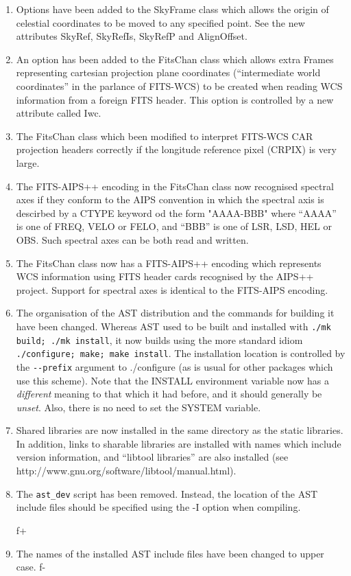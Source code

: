 \documentclass[twoside,11pt]{article}
\newcommand{\htmladdnormallink}[2]{#1}
\begin{document}
\begin{enumerate}

\item Options have been added to the SkyFrame class which allows the
origin 
of celestial coordinates to be moved to any specified point. See the new
attributes SkyRef, SkyRefIs, SkyRefP and AlignOffset.

\item An option has been added to the FitsChan class which allows extra
Frames representing cartesian projection plane coordinates (``intermediate 
world coordinates'' in the parlance of FITS-WCS) to be created when
reading 
WCS information from a foreign FITS header. This option is controlled by
a new attribute called Iwc.

\item The FitsChan class which been modified to interpret FITS-WCS CAR
projection headers correctly if the longitude reference pixel (CRPIX) is 
very large.

\item The  FITS-AIPS++ encoding in the FitsChan class now recognised
spectral axes if they conform to the AIPS convention in which the
spectral axis is descirbed by a CTYPE keyword od the form "AAAA-BBB"
where ``AAAA'' is one of FREQ, VELO or FELO, and ``BBB'' is one of LSR, LSD,
HEL or OBS. Such spectral axes can be both read and written.

\item The FitsChan class now has a FITS-AIPS++ encoding which represents
WCS information using FITS header cards recognised by the AIPS++ project.
Support for spectral axes is identical to the FITS-AIPS encoding.

\item The organisation of the AST distribution and the commands for
building it have been changed. Whereas AST used to be built and installed
with \verb+./mk build; ./mk install+, it now builds using the more standard
idiom \verb+./configure; make; make install+. The installation location is
controlled by the \verb+--prefix+ argument to ./configure (as is usual
for other packages which use this scheme).  Note that the INSTALL environment 
variable now has a \emph{different} meaning to that which it had
before, and it should generally be \emph{unset}. Also, there is no need to
set the SYSTEM variable.

\item Shared libraries are now installed in the same directory as the
static libraries. In addition, links to sharable libraries are installed 
with names which include version information, and ``libtool libraries'' 
are also installed (see \htmladdnormallink{http://www.gnu.org/software/libtool/manual.html}{
http://www.gnu.org/software/libtool/manual.html}).

\item The \verb+ast_dev+ script has been removed. Instead, the location of
the AST include files should be specified using the -I option when
compiling.

f+
\item The names of the installed AST include files have been changed to
upper case.
f-

\end{enumerate}
\end{document}

